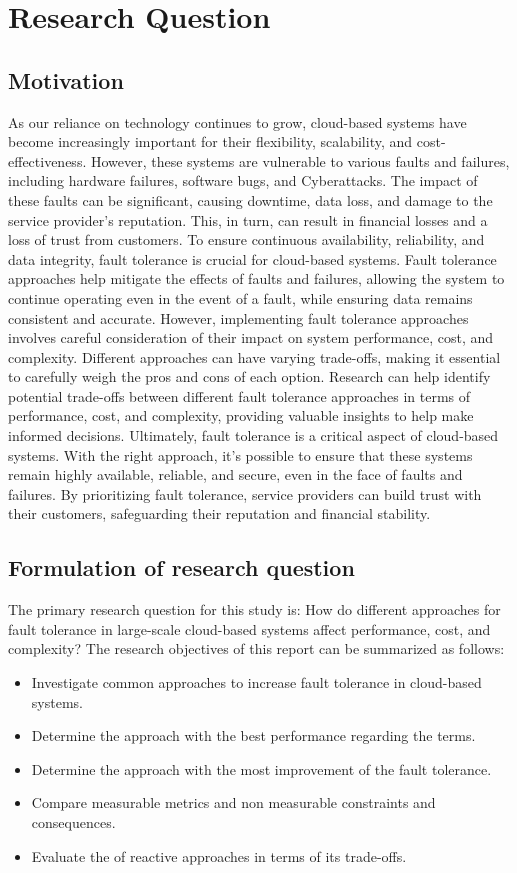 \documentclass[lettersize,journal]{IEEEtran}
\begin{document}
\section{Research Question}

\subsection{Motivation}
\noindent As our reliance on technology continues to grow, cloud-based systems have become increasingly important for their flexibility, scalability, and cost-effectiveness. However, these systems are vulnerable to various faults and failures, including hardware failures, software bugs, and Cyberattacks. The impact of these faults can be significant, causing downtime, data loss, and damage to the service provider's reputation. This, in turn, can result in financial losses and a loss of trust from customers.
To ensure continuous availability, reliability, and data integrity, fault tolerance is crucial for cloud-based systems. Fault tolerance approaches help mitigate the effects of faults and failures, allowing the system to continue operating even in the event of a fault, while ensuring data remains consistent and accurate. 
However, implementing fault tolerance approaches involves careful consideration of their impact on system performance, cost, and complexity. Different approaches can have varying trade-offs, making it essential to carefully weigh the pros and cons of each option. Research can help identify potential trade-offs between different fault tolerance approaches in terms of performance, cost, and complexity, providing valuable insights to help make informed decisions. 
Ultimately, fault tolerance is a critical aspect of cloud-based systems. With the right approach, it's possible to ensure that these systems remain highly available, reliable, and secure, even in the face of faults and failures. By prioritizing fault tolerance, service providers can build trust with their customers, safeguarding their reputation and financial stability.

\subsection{Formulation of research question}
\noindent The primary research question for this study is: How do different approaches for fault tolerance in large-scale cloud-based systems affect performance, cost, and complexity? 
The research objectives of this report can be summarized as follows:
\begin{itemize}{}{}
\item{Investigate common approaches to increase fault tolerance in cloud-based systems.}
\item{Determine the approach with the best performance regarding the terms.}
\item{Determine the approach with the most improvement of the fault tolerance.}
\item{Compare measurable metrics and non measurable constraints and consequences.}
\item{Evaluate the of reactive approaches in terms of its trade-offs.}
\end{itemize}
\end{document}
